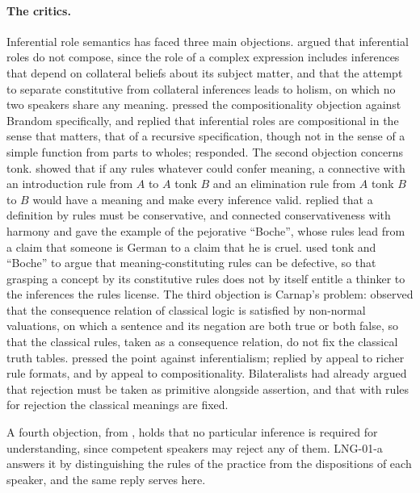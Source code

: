 \documentclass{situationist-preprint}
\begin{document}
\paragraph{The critics.} Inferential role semantics has faced three main objections. \citet{FodorLepore1991,FodorLepore1992} argued that inferential roles do not compose, since the role of a complex expression includes inferences that depend on collateral beliefs about its subject matter, and that the attempt to separate constitutive from collateral inferences leads to holism, on which no two speakers share any meaning. \citet{FodorLepore2001} pressed the compositionality objection against Brandom specifically, and \citet{Brandom2007} replied that inferential roles are compositional in the sense that matters, that of a recursive specification, though not in the sense of a simple function from parts to wholes; \citet{FodorLepore2007} responded. The second objection concerns tonk. \citet{Prior1960} showed that if any rules whatever could confer meaning, a connective with an introduction rule from $A$ to $A$ tonk $B$ and an elimination rule from $A$ tonk $B$ to $B$ would have a meaning and make every inference valid. \citet{Belnap1962} replied that a definition by rules must be conservative, and \citet{Dummett1973} connected conservativeness with harmony and gave the example of the pejorative \enquote{Boche}, whose rules lead from a claim that someone is German to a claim that he is cruel. \citet{Boghossian2003} used tonk and \enquote{Boche} to argue that meaning-constituting rules can be defective, so that grasping a concept by its constitutive rules does not by itself entitle a thinker to the inferences the rules license. The third objection is Carnap's problem: \citet{Carnap1943} observed that the consequence relation of classical logic is satisfied by non-normal valuations, on which a sentence and its negation are both true or both false, so that the classical rules, taken as a consequence relation, do not fix the classical truth tables. \citet{Raatikainen2008} pressed the point against inferentialism; \citet{MurziHjortland2009} replied by appeal to richer rule formats, and \citet{BonnayWesterstahl2016} by appeal to compositionality. Bilateralists \citep{Smiley1996,Rumfitt2000} had already argued that rejection must be taken as primitive alongside assertion, and that with rules for rejection the classical meanings are fixed.

A fourth objection, from \citet{Williamson2003}, holds that no particular inference is required for understanding, since competent speakers may reject any of them. LNG-01-a answers it by distinguishing the rules of the practice from the dispositions of each speaker, and the same reply serves here.
\end{document}
